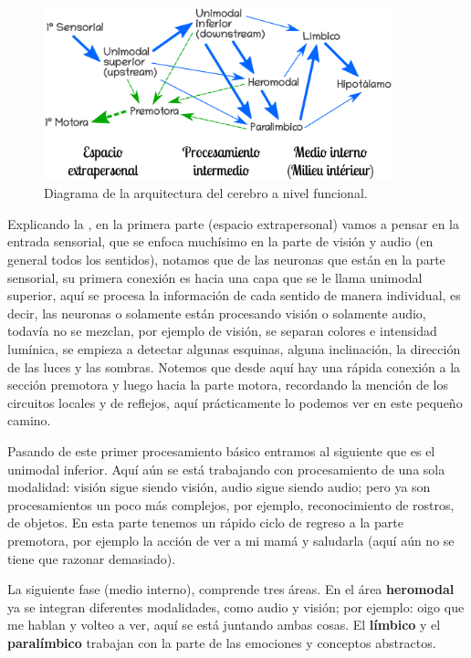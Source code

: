  \begin{figure}[h]
  \centering
  \includegraphics[width=0.9\textwidth]{../Figuras/zonasFuncionales.png}
  \caption{Diagrama de la arquitectura del cerebro a nivel funcional. \parencite{Mesulam1998}}
  \label{fig:zonasFun}
 \end{figure}


Explicando la , en la primera parte (espacio extrapersonal) vamos a pensar en la entrada sensorial, que se enfoca muchísimo en la parte de visión y audio (en general todos los sentidos), notamos que de las neuronas que están en la parte sensorial, su primera conexión es hacia una capa que se le llama unimodal superior,  aquí se procesa la información de cada sentido de manera individual, es decir, las neuronas o solamente están procesando visión o solamente audio, todavía no se mezclan, por ejemplo de visión, se separan colores e intensidad lumínica, se empieza a detectar algunas esquinas, alguna inclinación, la dirección de las luces y las sombras. Notemos que desde aquí hay una rápida conexión a la sección premotora y luego hacia la parte motora, recordando la mención de los circuitos locales y de reflejos, aquí prácticamente lo podemos ver en este pequeño camino.


Pasando de este primer procesamiento básico entramos al siguiente que es el unimodal inferior.  Aquí aún se está trabajando con procesamiento de una sola modalidad: visión sigue siendo visión, audio sigue siendo audio; pero ya son procesamientos un poco más complejos, por ejemplo, reconocimiento de rostros, de objetos. En esta parte tenemos un rápido ciclo de regreso a la parte premotora, por ejemplo la acción de ver a mi mamá y saludarla (aquí aún no se tiene que razonar demasiado). 


La siguiente fase (medio interno), comprende tres áreas.  En el área \textbf{heromodal} ya se integran diferentes modalidades, como audio y visión; por ejemplo: oigo que me hablan y volteo a ver, aquí se está juntando ambas cosas.  El \textbf{límbico} y el \textbf{paralímbico} trabajan con la parte de las emociones y conceptos abstractos.


